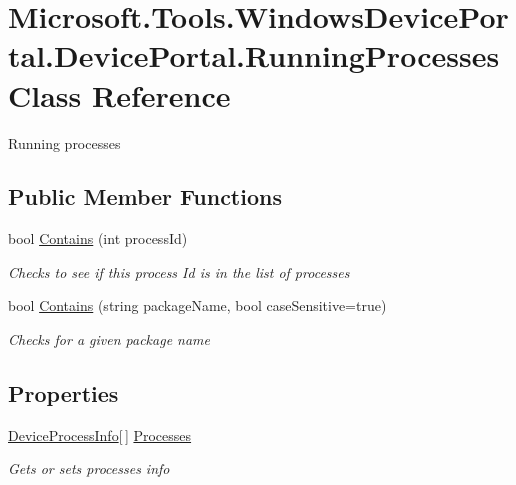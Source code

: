 \hypertarget{class_microsoft_1_1_tools_1_1_windows_device_portal_1_1_device_portal_1_1_running_processes}{}\section{Microsoft.\+Tools.\+Windows\+Device\+Portal.\+Device\+Portal.\+Running\+Processes Class Reference}
\label{class_microsoft_1_1_tools_1_1_windows_device_portal_1_1_device_portal_1_1_running_processes}


Running processes  


\subsection*{Public Member Functions}
\begin{DoxyCompactItemize}
\item 
bool \hyperlink{class_microsoft_1_1_tools_1_1_windows_device_portal_1_1_device_portal_1_1_running_processes_a591c056f3e90a548233ecf39499f62e1}{Contains} (int process\+Id)
\begin{DoxyCompactList}\small\item\em Checks to see if this process Id is in the list of processes \end{DoxyCompactList}\item 
bool \hyperlink{class_microsoft_1_1_tools_1_1_windows_device_portal_1_1_device_portal_1_1_running_processes_a7e358b7232e394ec60d6a7cd81ac70d4}{Contains} (string package\+Name, bool case\+Sensitive=true)
\begin{DoxyCompactList}\small\item\em Checks for a given package name \end{DoxyCompactList}\end{DoxyCompactItemize}
\subsection*{Properties}
\begin{DoxyCompactItemize}
\item 
\hyperlink{class_microsoft_1_1_tools_1_1_windows_device_portal_1_1_device_portal_1_1_device_process_info}{Device\+Process\+Info}\mbox{[}$\,$\mbox{]} \hyperlink{class_microsoft_1_1_tools_1_1_windows_device_portal_1_1_device_portal_1_1_running_processes_a49653cff928c349768c5d987bc8fbec4}{Processes}
\begin{DoxyCompactList}\small\item\em Gets or sets processes info \end{DoxyCompactList}\end{DoxyCompactItemize}


